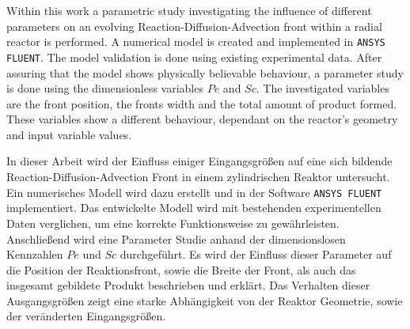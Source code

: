 \documentclass[../thesis.tex]{subfiles}
\begin{document}
\label{chp:abstract}

Within this work a parametric study investigating the influence of different parameters on an evolving Reaction-Diffusion-Advection front within a radial reactor is performed. A numerical model is created and implemented in \texttt{ANSYS FLUENT}. The model validation is done using existing experimental data. After assuring that the model shows physically believable behaviour, a parameter study is done using the dimensionless variables $Pe$ and $Sc$. The investigated variables are the front position, the fronts width and the total amount of product formed. These variables show a different behaviour, dependant on the reactor's geometry and input variable values.

\newpage

In dieser Arbeit wird der Einfluss einiger Eingangsgrößen auf eine sich bildende Reaction-Diffusion-Advection Front in einem zylindrischen Reaktor untersucht. Ein numerisches Modell wird dazu erstellt und in der Software \texttt{ANSYS FLUENT} implementiert. Das entwickelte Modell wird mit bestehenden experimentellen Daten verglichen, um eine korrekte Funktionsweise zu gewährleisten. Anschließend wird eine Parameter Studie anhand der dimensionslosen Kennzahlen $Pe$ und $Sc$ durchgeführt. Es wird der Einfluss dieser Parameter auf die Position der Reaktionsfront, sowie die Breite der Front, als auch das insgesamt gebildete Produkt beschrieben und erklärt. Das Verhalten dieser Ausgangsgrößen zeigt eine starke Abhängigkeit von der Reaktor Geometrie, sowie der veränderten Eingangsgrößen.
\end{document}
